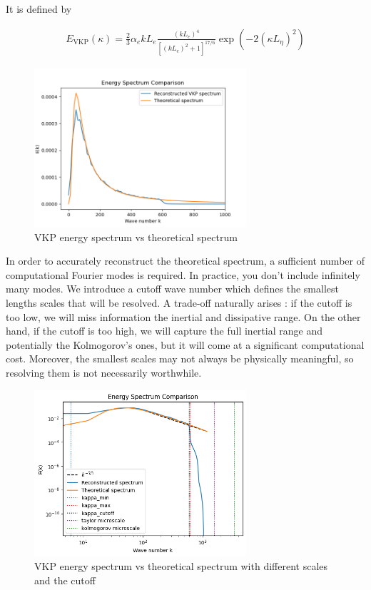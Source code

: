 \documentclass[a4paper,12pt]{article}
\theoremstyle{definition}
\begin{document}
It is defined by 

\begin{align}
    E_{\text{VKP}}(\kappa)=\frac{2}{3}\alpha_e k L_e \frac{(kL_e)^4}{[(kL_e)^2+1]^{17/6}}\exp(-2(\kappa L_\eta)^2)
\end{align}

\begin{figure}[H]
    \centering
    \includegraphics[width=0.7\textwidth]{illustrations/Energy_Spectrum_VKP.png}
    \caption{VKP energy spectrum vs theoretical spectrum}
    \label{VKPspectrum}
\end{figure}

In order to accurately reconstruct the theoretical spectrum, a sufficient number of computational Fourier modes is required. In practice, you don’t include infinitely many modes. We introduce a cutoff wave number which defines the smallest lengths scales that will be resolved. A trade-off naturally arises : if the cutoff is too low, we will miss information the inertial and dissipative range. On the other hand, if the cutoff is too high, we will capture the full inertial range and potentially the Kolmogorov's ones, but it will come at a significant computational cost. Moreover, the smallest scales may not always be physically meaningful, so resolving them is not necessarily worthwhile.

\begin{figure}[H]
    \centering
    \includegraphics[width=0.7\textwidth]{illustrations/EnergySpectrumTrained.png}
    \caption{VKP energy spectrum vs theoretical spectrum with different scales and the cutoff}
\end{figure}
\end{document}
